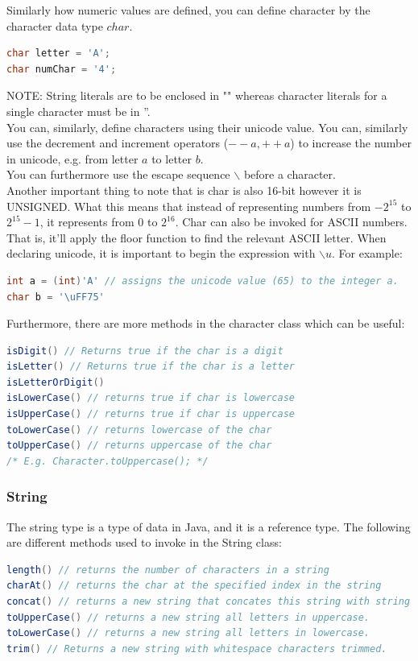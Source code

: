 \documentclass[11pt,a4 paper]{book}
\theoremstyle{plain}
\theoremstyle{definition}
\theoremstyle{remark}
\begin{document}
\begin{flushleft}
Similarly how numeric values are defined, you can define character by the character data type $char$.
\begin{lstlisting}[language = Java ]
char letter = 'A';
char numChar = '4';
\end{lstlisting}
NOTE: String literals are to be enclosed in "" whereas character literals for a single character must be in ''. \\
You can, similarly, define characters using their unicode value. You can, similarly use the decrement and increment operators ($--a, ++a $) to increase the number in unicode, e.g. from letter $a$ to letter $b$. \\
You can furthermore use the escape sequence $\backslash$ before a character. \\
Another important thing to note that is char is also 16-bit however it is UNSIGNED. What this means that instead of representing numbers from $-2^{15}$ to $2^{15}-1$, it represents from $0$ to $2^{16}$. Char can also be invoked for ASCII numbers. That is, it'll apply the floor function to find the relevant ASCII letter. When declaring unicode, it is important to begin the expression with $\backslash u$. For example:
\begin{lstlisting}[language = Java]
int a = (int)'A' // assigns the unicode value (65) to the integer a.
char b = '\uFF75'
\end{lstlisting}
Furthermore, there are more methods in the character class which can be useful:
\begin{lstlisting}[language = Java]
isDigit() // Returns true if the char is a digit
isLetter() // Returns true if the char is a letter
isLetterOrDigit() 
isLowerCase() // returns true if char is lowercase
isUpperCase() // returns true if char is uppercase
toLowerCase() // returns lowercase of the char
toUpperCase() // returns uppercase of the char
/* E.g. Character.toUppercase(); */
\end{lstlisting}
\subsubsection{String}
The string type is a type of data in Java, and it is a reference type. The following are different methods used to invoke in the String class:
\begin{lstlisting}[language = Java]
length() // returns the number of characters in a string
charAt() // returns the char at the specified index in the string
concat() // returns a new string that concates this string with string input
toUpperCase() // returns a new string all letters in uppercase.
toLowerCase() // returns a new string all letters in lowercase.
trim() // Returns a new string with whitespace characters trimmed.
\end{lstlisting}


\end{flushleft}
\end{document}
